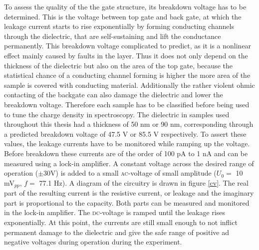 To assess the quality of the the gate structure, its breakdown voltage has to be determined. This is the voltage between top gate and back gate, at which the leakage current starts to rise exponentially by forming conducting channels through the dielectric, that are self-sustaining and lift the conductance permanently\cite{klein_maximum_1966}. This breakdown voltage complicated to predict, as it is a nonlinear effect mainly caused by faults in the \sio layer. Thus it does not only depend on the thickness of the dielectric but also on the area of the top gate, because the statistical chance of a conducting channel forming is higher the more area of the sample is covered with conducting material. Additionally the rather violent ohmic contacting of the backgate can also damage the dielectric and lower the breakdown voltage. Therefore each sample has to be classified before being used to tune the charge density in spectroscopy. The dielectric in samples used throughout this thesis had a thickness of 50 nm or 90 nm, corresponding through a predicted breakdown voltage of 47.5 V or 85.5 V respectively. To assert these values, the leakage currents have to be monitored while ramping up the voltage. Before breakdown these currents are of the order of 100 pA to 1 nA and can be measured using a lock-in amplifier. A constant voltage across the desired range of operation ({\small$\pm $}30V) is added to a small \textsc{ac}-voltage of small amplitude ($U_0 = $ 10 mV$_{pp}$, $f = $ 77.1 Hz). A diagram of the circuitry is drawn in figure \ref{cv}. The real part of the resulting current is the resistive current, or leakage and the imaginary part is proportional to the capacity. Both parts can be measured and monitored in the lock-in amplifier. The \textsc{dc}-voltage is ramped until the leakage rises exponentially. At this point, the currents are still small enough to not inflict permanent damage to the dielectric and give the safe range of positive ad negative voltages during operation during the experiment.

